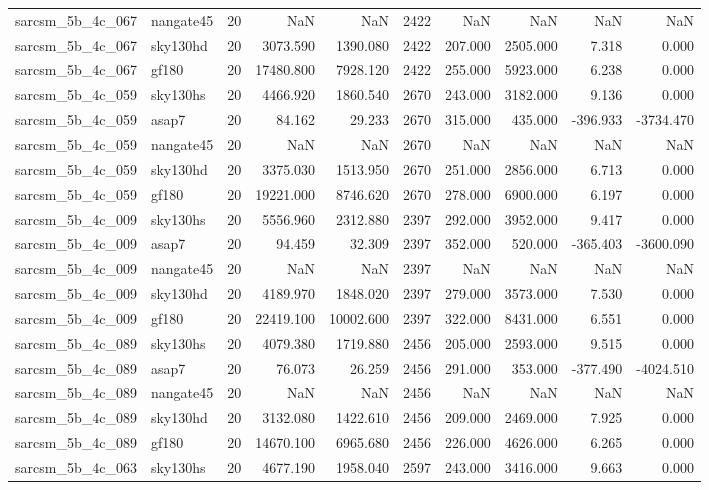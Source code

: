 \begin{tabular}{llrrrrrrrr}
sarcsm\_5b\_4c\_067 & nangate45 & 20 & NaN & NaN & 2422 & NaN & NaN & NaN & NaN \\
sarcsm\_5b\_4c\_067 & sky130hd & 20 & 3073.590 & 1390.080 & 2422 & 207.000 & 2505.000 & 7.318 & 0.000 \\
sarcsm\_5b\_4c\_067 & gf180 & 20 & 17480.800 & 7928.120 & 2422 & 255.000 & 5923.000 & 6.238 & 0.000 \\
sarcsm\_5b\_4c\_059 & sky130hs & 20 & 4466.920 & 1860.540 & 2670 & 243.000 & 3182.000 & 9.136 & 0.000 \\
sarcsm\_5b\_4c\_059 & asap7 & 20 & 84.162 & 29.233 & 2670 & 315.000 & 435.000 & -396.933 & -3734.470 \\
sarcsm\_5b\_4c\_059 & nangate45 & 20 & NaN & NaN & 2670 & NaN & NaN & NaN & NaN \\
sarcsm\_5b\_4c\_059 & sky130hd & 20 & 3375.030 & 1513.950 & 2670 & 251.000 & 2856.000 & 6.713 & 0.000 \\
sarcsm\_5b\_4c\_059 & gf180 & 20 & 19221.000 & 8746.620 & 2670 & 278.000 & 6900.000 & 6.197 & 0.000 \\
sarcsm\_5b\_4c\_009 & sky130hs & 20 & 5556.960 & 2312.880 & 2397 & 292.000 & 3952.000 & 9.417 & 0.000 \\
sarcsm\_5b\_4c\_009 & asap7 & 20 & 94.459 & 32.309 & 2397 & 352.000 & 520.000 & -365.403 & -3600.090 \\
sarcsm\_5b\_4c\_009 & nangate45 & 20 & NaN & NaN & 2397 & NaN & NaN & NaN & NaN \\
sarcsm\_5b\_4c\_009 & sky130hd & 20 & 4189.970 & 1848.020 & 2397 & 279.000 & 3573.000 & 7.530 & 0.000 \\
sarcsm\_5b\_4c\_009 & gf180 & 20 & 22419.100 & 10002.600 & 2397 & 322.000 & 8431.000 & 6.551 & 0.000 \\
sarcsm\_5b\_4c\_089 & sky130hs & 20 & 4079.380 & 1719.880 & 2456 & 205.000 & 2593.000 & 9.515 & 0.000 \\
sarcsm\_5b\_4c\_089 & asap7 & 20 & 76.073 & 26.259 & 2456 & 291.000 & 353.000 & -377.490 & -4024.510 \\
sarcsm\_5b\_4c\_089 & nangate45 & 20 & NaN & NaN & 2456 & NaN & NaN & NaN & NaN \\
sarcsm\_5b\_4c\_089 & sky130hd & 20 & 3132.080 & 1422.610 & 2456 & 209.000 & 2469.000 & 7.925 & 0.000 \\
sarcsm\_5b\_4c\_089 & gf180 & 20 & 14670.100 & 6965.680 & 2456 & 226.000 & 4626.000 & 6.265 & 0.000 \\
sarcsm\_5b\_4c\_063 & sky130hs & 20 & 4677.190 & 1958.040 & 2597 & 243.000 & 3416.000 & 9.663 & 0.000 \\

\end{tabular}
